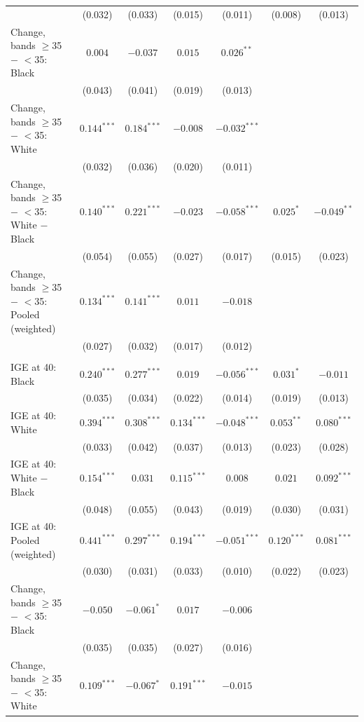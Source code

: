 \begin{table}[!htbp]
{{\begin{tabular}{lcccccc}
 & (0.032) & (0.033) & (0.015) & (0.011) & (0.008) & (0.013) \\
Change, bands $\geq$35 $-$ $<$35: Black & $0.004$ & $-0.037$ & $0.015$ & $0.026^{**}$ &  &  \\
 & (0.043) & (0.041) & (0.019) & (0.013) &  &  \\
Change, bands $\geq$35 $-$ $<$35: White & $0.144^{***}$ & $0.184^{***}$ & $-0.008$ & $-0.032^{***}$ &  &  \\
 & (0.032) & (0.036) & (0.020) & (0.011) &  &  \\
Change, bands $\geq$35 $-$ $<$35: White $-$ Black & $0.140^{***}$ & $0.221^{***}$ & $-0.023$ & $-0.058^{***}$ & $0.025^{*}$ & $-0.049^{**}$ \\
 & (0.054) & (0.055) & (0.027) & (0.017) & (0.015) & (0.023) \\
Change, bands $\geq$35 $-$ $<$35: Pooled (weighted) & $0.134^{***}$ & $0.141^{***}$ & $0.011$ & $-0.018$ &  &  \\
 & (0.027) & (0.032) & (0.017) & (0.012) &  &  \\
\addlinespace
\multicolumn{7}{l}{\textit{Daughters}} \\
IGE at 40: Black & $0.240^{***}$ & $0.277^{***}$ & $0.019$ & $-0.056^{***}$ & $0.031^{*}$ & $-0.011$ \\
 & (0.035) & (0.034) & (0.022) & (0.014) & (0.019) & (0.013) \\
IGE at 40: White & $0.394^{***}$ & $0.308^{***}$ & $0.134^{***}$ & $-0.048^{***}$ & $0.053^{**}$ & $0.080^{***}$ \\
 & (0.033) & (0.042) & (0.037) & (0.013) & (0.023) & (0.028) \\
IGE at 40: White $-$ Black & $0.154^{***}$ & $0.031$ & $0.115^{***}$ & $0.008$ & $0.021$ & $0.092^{***}$ \\
 & (0.048) & (0.055) & (0.043) & (0.019) & (0.030) & (0.031) \\
IGE at 40: Pooled (weighted) & $0.441^{***}$ & $0.297^{***}$ & $0.194^{***}$ & $-0.051^{***}$ & $0.120^{***}$ & $0.081^{***}$ \\
 & (0.030) & (0.031) & (0.033) & (0.010) & (0.022) & (0.023) \\
Change, bands $\geq$35 $-$ $<$35: Black & $-0.050$ & $-0.061^{*}$ & $0.017$ & $-0.006$ &  &  \\
 & (0.035) & (0.035) & (0.027) & (0.016) &  &  \\
Change, bands $\geq$35 $-$ $<$35: White & $0.109^{***}$ & $-0.067^{*}$ & $0.191^{***}$ & $-0.015$ &  &  \\

\end{tabular}}}
\end{table}
